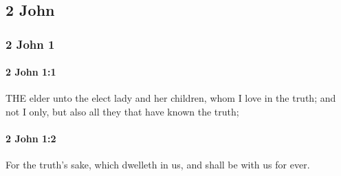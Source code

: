 \subsection{2 John}
	\label{2JOHN}

	\subsubsection{2 John 1} %
		\label{2JOHN-1}
	
		\paragraph{2 John 1:1} %
			\label{2JOHN-1-1}

			THE elder unto the elect lady and her children, whom I love in the truth; and not I only, but also all they that have known the truth;

			\begin{framed}
			\scriptsize
				\begin{compactdesc}
					\item[SBLG] 
				\end{compactdesc}
			\end{framed}

		\paragraph{2 John 1:2} %
			\label{2JOHN-1-2}

			For the truth's sake, which dwelleth in us, and shall be with us for ever.

